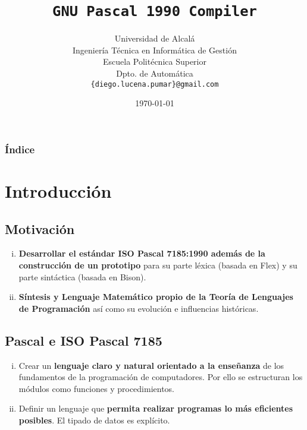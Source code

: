 \documentclass{beamer}
\title[\texttt{gp1990c}]{\texttt{GNU Pascal 1990 Compiler}}
\author[Diego Antonio Lucena Pumar]
{
Universidad de Alcalá\\
Ingeniería Técnica en Informática de Gestión\\
Escuela Politécnica Superior\\
Dpto. de Automática\\
\texttt{\{diego.lucena.pumar\}@gmail.com}
}
\date{\today}
\theoremstyle{definition}
\theoremstyle{remark}
\begin{document}
\begin{frame}

\titlepage

\end{frame}

\begin{frame}
  \frametitle{Índice}
  \begin{multicols}{2}
  \tableofcontents
  \end{multicols}
\end{frame}

\section{Introducción}

\subsection{Motivación}

\begin{frame}
\begin{enumerate}[i.]

\item \textbf{Desarrollar el estándar ISO Pascal 
7185:1990 además de la construcción de un prototipo} para su parte léxica (basada en 
Flex) y su
parte sintáctica (basada en Bison).

\item \textbf{Síntesis y Lenguaje Matemático propio de la Teoría de Lenguajes de
Programación} así como su evolución e influencias históricas.

\end{enumerate} 
\end{frame}

\subsection{Pascal e ISO Pascal 7185}

\begin{frame}
\begin{enumerate}[i.] 
\item Crear un \textbf{lenguaje claro y natural orientado a la enseñanza} de los
fundamentos de la programación de computadores. Por ello se estructuran los
módulos como funciones y procedimientos.
\item Definir un lenguaje que \textbf{permita realizar programas lo más
eficientes
posibles}. El tipado de datos es explícito.
\end{enumerate}
\end{frame}
\end{document}
